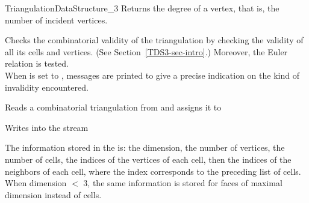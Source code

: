 \begin{ccRefConcept}{TriangulationDataStructure_3}
{Returns the degree of a vertex, that is, the number of incident vertices.
}

\begin{ccAdvanced}

{Checks the combinatorial validity of the triangulation by checking
the validity of all its cells and vertices. 
(See Section~\ref{TDS3-sec-intro}.) Moreover, the Euler relation is
tested.\\ 
When  is set to , messages are printed to give
a precise indication on the kind of invalidity encountered.}
\end{ccAdvanced}


{Reads a combinatorial triangulation from  and assigns it to }

{Writes  into the stream }

The information stored in the  is: 
the dimension, the number of vertices, the number of cells,
the indices of the vertices of each cell, then the indices of the
neighbors of each cell, where the index corresponds to the preceding
list of cells. When dimension $<$ 3, the same information is stored
for faces of maximal dimension instead of cells.

\ccHasModels


\ccSeeAlso

\\

\end{ccRefConcept}
